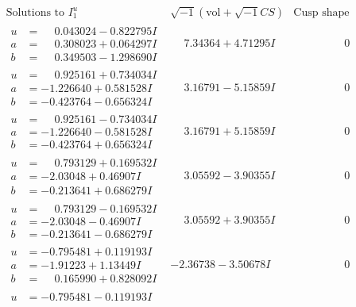 \documentclass[1p]{elsarticle_modified}
\theoremstyle{definition}
\newcommand{\I}{\sqrt{-1}}
\begin{document}
$$\begin{array}{c|c|c}
\text{Solutions to }I^u_{1}& \I (\text{vol} + \sqrt{-1}CS) & \text{Cusp shape}\\
 \hline 
\begin{aligned}
u &= \phantom{-}0.043024 - 0.822795 I \\
a &= \phantom{-}0.308023 + 0.064297 I \\
b &= \phantom{-}0.349503 - 1.298690 I\end{aligned}
 & \phantom{-}7.34364 + 4.71295 I & \phantom{-0.000000 } 0 \\ \hline\begin{aligned}
u &= \phantom{-}0.925161 + 0.734034 I \\
a &= -1.226640 + 0.581528 I \\
b &= -0.423764 - 0.656324 I\end{aligned}
 & \phantom{-}3.16791 - 5.15859 I & \phantom{-0.000000 } 0 \\ \hline\begin{aligned}
u &= \phantom{-}0.925161 - 0.734034 I \\
a &= -1.226640 - 0.581528 I \\
b &= -0.423764 + 0.656324 I\end{aligned}
 & \phantom{-}3.16791 + 5.15859 I & \phantom{-0.000000 } 0 \\ \hline\begin{aligned}
u &= \phantom{-}0.793129 + 0.169532 I \\
a &= -2.03048 + 0.46907 I \\
b &= -0.213641 + 0.686279 I\end{aligned}
 & \phantom{-}3.05592 - 3.90355 I & \phantom{-0.000000 } 0 \\ \hline\begin{aligned}
u &= \phantom{-}0.793129 - 0.169532 I \\
a &= -2.03048 - 0.46907 I \\
b &= -0.213641 - 0.686279 I\end{aligned}
 & \phantom{-}3.05592 + 3.90355 I & \phantom{-0.000000 } 0 \\ \hline\begin{aligned}
u &= -0.795481 + 0.119193 I \\
a &= -1.91223 + 1.13449 I \\
b &= \phantom{-}0.165990 + 0.828092 I\end{aligned}
 & -2.36738 - 3.50678 I & \phantom{-0.000000 } 0 \\ \hline\begin{aligned}
u &= -0.795481 - 0.119193 I \\

\end{aligned}
\end{array}$$
\end{document}

